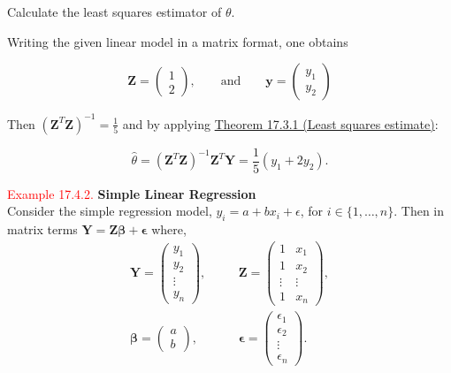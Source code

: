 \documentclass[
]{book}
\begin{document}
Calculate the least squares estimator of \(\theta\).

Writing the given linear model in a matrix format, one obtains

\[ \mathbf{Z} = \begin{pmatrix} 1 \\ 2 \end{pmatrix}, \qquad \text{and} \qquad \mathbf{y} = \begin{pmatrix} y_1 \\ y_2 \end{pmatrix} \]

Then \((\mathbf{Z}^T\mathbf{Z})^{-1} = \frac{1}{5}\) and by applying \protect\hyperlink{Sec_Linear_LSE:thm:lse}{Theorem 17.3.1 (Least squares estimate)}:

\[\hat{\theta} = (\mathbf{Z}^T\mathbf{Z})^{-1}\mathbf{Z}^T \mathbf{Y} = \frac{1}{5}(y_1 + 2y_2).\]

\hfill\break

\hypertarget{Sec_Linear_LSE:ex:reg}{}
\textcolor{red}{Example 17.4.2.}
{\textbf{Simple Linear Regression}}\\
Consider the simple regression model, \(y_i =a +b x_i + \epsilon\), for \(i \in \{ 1,\ldots ,n \}\). Then in matrix terms \(\mathbf{Y} = \mathbf{Z} \mathbf{\beta} + \mathbf{\epsilon}\) where,\\

\begin{align*}
\mathbf{Y} = \begin{pmatrix} y_1 \\ y_2 \\ \vdots \\ y_n \end{pmatrix}, &\quad& \mathbf{Z} = \begin{pmatrix} 1 & x_1 \\ 1 & x_2 \\ \vdots & \vdots \\ 1 & x_n \end{pmatrix}, \\[5pt]
\mathbf{\beta} = \begin{pmatrix} a \\ b \end{pmatrix}, &\quad& \mathbf{\epsilon} = \begin{pmatrix} \epsilon_1 \\ \epsilon_2 \\ \vdots \\ \epsilon_n \end{pmatrix}.
\end{align*}
\end{document}
